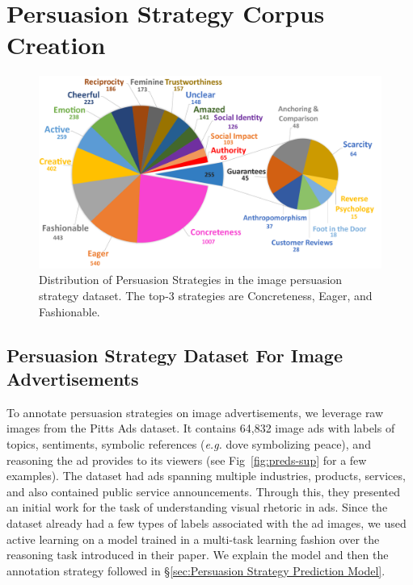 \documentclass[hidelinks,11pt,a4paper]{report}
\begin{document}


\section{Persuasion Strategy Corpus Creation}
\label{sec:Persuasion Strategy Corpus Creation}

\begin{figure}[t]
        \centering
        \includegraphics[scale=0.3]{images/pie_chart.pdf}
        \caption{Distribution of Persuasion Strategies in the image persuasion strategy dataset. The top-3 strategies are Concreteness, Eager, and Fashionable. \small}
        \label{fig:persuasion-strategies-distribution}
    \end{figure}


\subsection{Persuasion Strategy Dataset For Image Advertisements}

To annotate persuasion strategies on image advertisements, we leverage raw images from the Pitts Ads dataset. It contains 64,832 image ads with labels of topics, sentiments, symbolic references (\textit{e.g.} dove symbolizing peace), and reasoning the ad provides to its viewers (see Fig~\ref{fig:preds-sup} for a few examples). The dataset had ads spanning multiple industries, products, services, and also contained public service announcements. Through this, they presented an initial work for the task of understanding visual rhetoric in ads. Since the dataset already had a few types of labels associated with the ad images, we used active learning on a model trained in a multi-task learning fashion over the reasoning task introduced in their paper. We explain the model and then the annotation strategy followed in \S\ref{sec:Persuasion Strategy Prediction Model}. 
\end{document}
